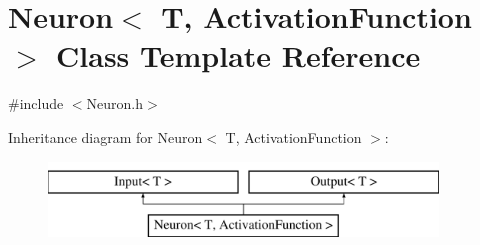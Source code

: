 \hypertarget{class_neuron}{\section{\-Neuron$<$ \-T, \-Activation\-Function $>$ \-Class \-Template \-Reference}
\label{class_neuron}
}


{\ttfamily \#include $<$\-Neuron.\-h$>$}

\-Inheritance diagram for \-Neuron$<$ \-T, \-Activation\-Function $>$\-:\begin{figure}[H]
\begin{center}
\leavevmode
\includegraphics[height=2.000000cm]{class_neuron}
\end{center}
\end{figure}
